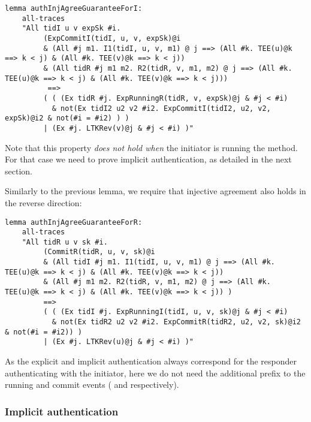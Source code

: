 
\begin{lstlisting}
lemma authInjAgreeGuaranteeForI:
    all-traces
    "All tidI u v expSk #i.
         (ExpCommitI(tidI, u, v, expSk)@i
	     & (All #j m1. I1(tidI, u, v, m1) @ j ==> (All #k. TEE(u)@k ==> k < j) & (All #k. TEE(v)@k ==> k < j))
         & (All tidR #j m1 m2. R2(tidR, v, m1, m2) @ j ==> (All #k. TEE(u)@k ==> k < j) & (All #k. TEE(v)@k ==> k < j)))
          ==>
         ( ( (Ex tidR #j. ExpRunningR(tidR, v, expSk)@j & #j < #i)
           & not(Ex tidI2 u2 v2 #i2. ExpCommitI(tidI2, u2, v2, expSk)@i2 & not(#i = #i2) ) )
         | (Ex #j. LTKRev(v)@j & #j < #i) )"
\end{lstlisting}

Note that this property \emph{does not hold when} the initiator is
running the \mStat{} method.
%
For that case we need to prove implicit authentication, as detailed in
the next section.

Similarly to the previous lemma, we require that injective agreement also holds
in the reverse direction:

\begin{lstlisting}
lemma authInjAgreeGuaranteeForR:
    all-traces
    "All tidR u v sk #i.
         (CommitR(tidR, u, v, sk)@i
	     & (All tidI #j m1. I1(tidI, u, v, m1) @ j ==> (All #k. TEE(u)@k ==> k < j) & (All #k. TEE(v)@k ==> k < j))
         & (All #j m1 m2. R2(tidR, v, m1, m2) @ j ==> (All #k. TEE(u)@k ==> k < j) & (All #k. TEE(v)@k ==> k < j)) )
         ==>
         ( ( (Ex tidI #j. ExpRunningI(tidI, u, v, sk)@j & #j < #i)
           & not(Ex tidR2 u2 v2 #i2. ExpCommitR(tidR2, u2, v2, sk)@i2 & not(#i = #i2)) )
         | (Ex #j. LTKRev(u)@j & #j < #i) )"
\end{lstlisting}

As the explicit and implicit authentication always correspond for the
responder authenticating with the initiator, here we do not need the
additional  prefix to the running and commit events
( and  respectively).

\spacehack
\subsubsection{Implicit authentication}

